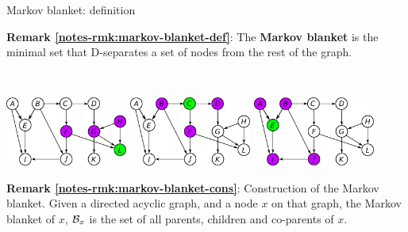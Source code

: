 \documentclass{beamer}
\newcommand{\remark}[2]{\noindent\colorbox{red!10}{\parbox{0.995\textwidth}{\textbf{Remark \ref{notes-rmk:#1}}: #2}}\\}
\begin{document}
\begin{frame}{Markov blanket: definition}
 \remark{markov-blanket-def}{The \textbf{Markov blanket} is the minimal set that D-separates a set of nodes from the rest of the graph.}
 \begin{center}
    {\includegraphics[width=0.3\textwidth]{fig/D-separation-LBL.pdf}}\hspace{4mm}%
    {\includegraphics[width=0.3\textwidth]{fig/D-separation-CBC.pdf}}\hspace{4mm}%
    {\includegraphics[width=0.3\textwidth]{fig/D-separation-EBE.pdf}}%
 \end{center}
 \remark{markov-blanket-cons}{Construction of the Markov blanket.    Given a directed acyclic graph, and a node $x$ on that graph, the Markov blanket of $x$, ${\cal B}_x$ is the set of all parents, children and co-parents of $x$.}
\end{frame}
\end{document}
